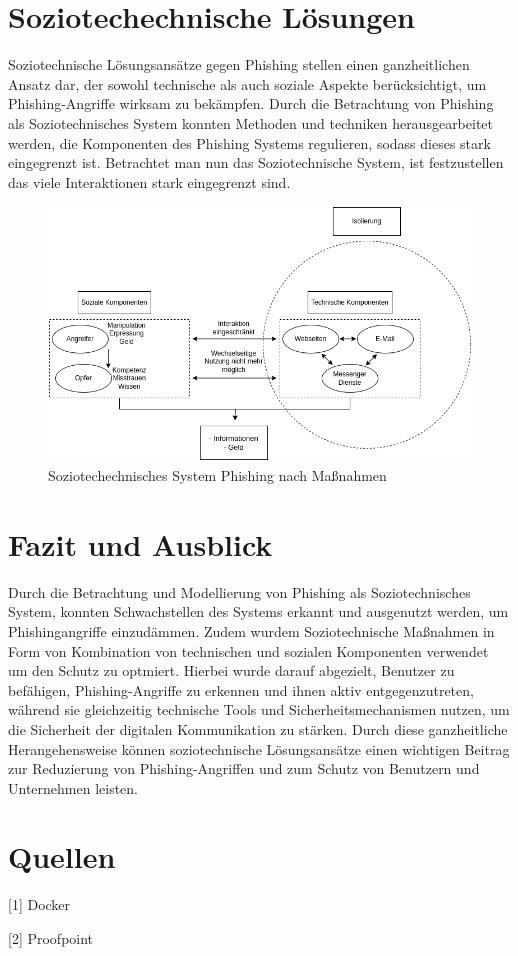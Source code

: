 \documentclass[journal=tosc,final]{iacrtrans}
\begin{document}
\section{Soziotechechnische Lösungen}
Soziotechnische Lösungsansätze gegen Phishing stellen einen ganzheitlichen Ansatz dar, der sowohl technische als auch soziale Aspekte berücksichtigt, um Phishing-Angriffe wirksam zu bekämpfen.
Durch die Betrachtung von Phishing als Soziotechnisches System konnten Methoden und techniken herausgearbeitet werden, die Komponenten des Phishing Systems regulieren, sodass dieses stark eingegrenzt ist. Betrachtet man nun das Soziotechnische System, ist festzustellen das viele Interaktionen stark eingegrenzt sind.
\begin{figure}[h]
 \caption{Soziotechechnisches System Phishing nach Maßnahmen}
 \centering \includegraphics[scale=0.5]{iso.png}
\end{figure}

\section{Fazit und Ausblick}
Durch die Betrachtung und Modellierung von Phishing als Soziotechnisches System, konnten Schwachstellen des Systems erkannt und ausgenutzt werden, um Phishingangriffe einzudämmen. Zudem wurdem Soziotechnische Maßnahmen in Form von Kombination von technischen und sozialen Komponenten verwendet um den Schutz zu optmiert. Hierbei wurde darauf abgezielt, Benutzer zu befähigen, Phishing-Angriffe zu erkennen und ihnen aktiv entgegenzutreten, während sie gleichzeitig technische Tools und Sicherheitsmechanismen nutzen, um die Sicherheit der digitalen Kommunikation zu stärken. Durch diese ganzheitliche Herangehensweise können soziotechnische Lösungsansätze einen wichtigen Beitrag zur Reduzierung von Phishing-Angriffen und zum Schutz von Benutzern und Unternehmen leisten.
\newpage
\section{Quellen}
[1] Docker 

[2] Proofpoint
\end{document}

